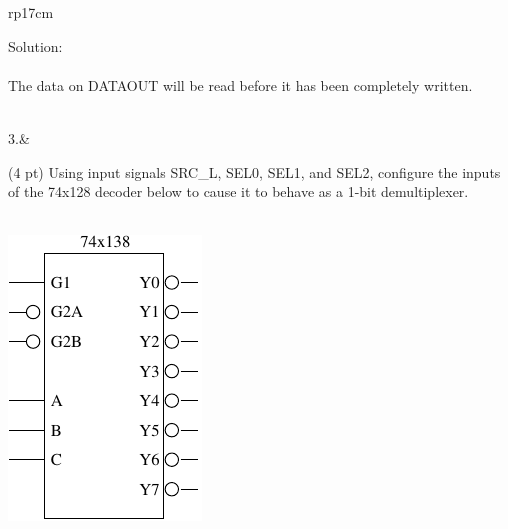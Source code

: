 \documentclass{article}
\begin{document}
\begin{longtable}[l]{rp{17cm}}
\begin{minipage}[t]{\linewidth}
Solution: \\ \\
The data on DATAOUT will be read before it has been completely written.
\end{minipage}\\
\medskip
3.&\begin{minipage}[t]{\linewidth}(4 pt) Using input signals SRC\_L, SEL0, SEL1, and SEL2, configure the inputs of the 74x128 decoder below to cause it to behave as a 1-bit demultiplexer.\\ \\
\begin{center}
  \includegraphics{../Muxes/Assessments/74x138Schematic}
\end{center}


\end{minipage}
\end{longtable}
\end{document}
